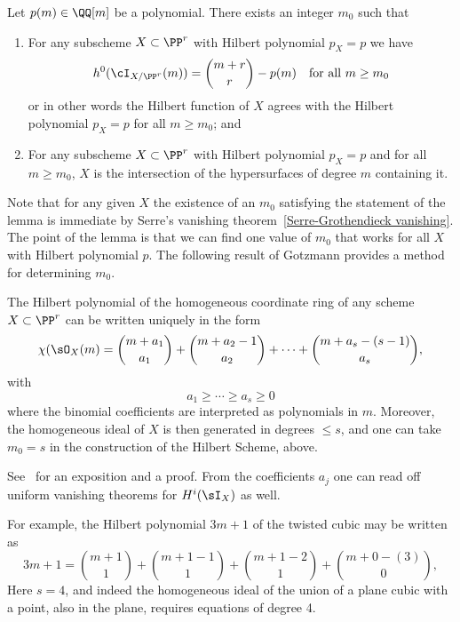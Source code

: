 \begin{lemma}\label{matsusaka}
Let $p(m) \in \QQ[m]$ be a polynomial. There exists an integer $m_0$ such that

\begin{enumerate}  

\item For any subscheme $X \subset \PP^r$ with Hilbert polynomial $p_X = p$ we have
$$
h^0(\cI_{X/\PP^r}(m)) = \binom{m+r}{r} - p(m) \quad \text{for all } m \geq m_0
$$
or in other words the Hilbert function of $X$ agrees with the Hilbert polynomial $p_X = p$ for all $m \geq m_0$; and

\item For any subscheme $X \subset \PP^r$ with Hilbert polynomial $p_X = p$ and for all $m \geq m_0$, $X$ is the intersection of the hypersurfaces of degree $m$ containing it.
\end{enumerate}
\end{lemma}
Note that  for any given $X$ the existence of an $m_0$ satisfying the statement of the lemma is immediate by Serre's vanishing theorem~\ref{Serre-Grothendieck vanishing}. The point of the lemma is that we can find one value of $m_0$ that works for all $X$ with Hilbert polynomial $p$. The following result of Gotzmann provides a method for determining $m_0$. 

\begin{theorem}
The Hilbert polynomial  of the homogeneous coordinate ring of any scheme $X\subset \PP^r$ can be written uniquely in the form
$$
\chi(\sO_X(m) = {m+a_1\choose a_1}+ {m+a_2 -1\choose a_2}+ \cdots+{m+a_s -(s-1)\choose a_s},
$$
with 
$$
a_1\geq \cdots \geq a_s \geq 0
$$
where the binomial coefficients are interpreted as polynomials in $m$. Moreover, the homogeneous ideal of $X$ is
then generated in degrees $\leq s$, and one can take $m_0 = s$ in the construction of the Hilbert Scheme, above.
\end{theorem}
See~\cite{MR1023391} %
for an exposition and a proof. From the coefficients $a_j$ one can read off uniform vanishing theorems for $H^i(\sI_X)$
 as well.
 
 For example, the Hilbert polynomial $3m+1$ of the twisted cubic may be written as
 $$
 3m+1 =  {m+1\choose 1}+ {m+1 -1\choose 1}+{m+1 -2\choose 1}+{m+0 -(3)\choose 0},
 $$
 Here $s=4$, and indeed the homogeneous ideal of the union of a plane cubic with a point, also in the plane,
 requires equations of degree 4.
 

